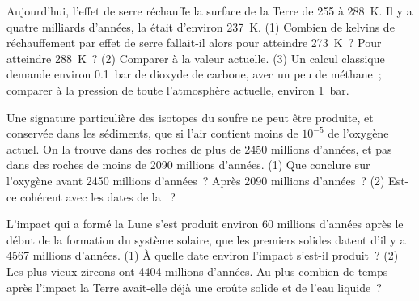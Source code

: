 \begin{exercise}[$\star\star\star$]\label{exo:g12:early-earth:13}
Aujourd'hui, l'effet de serre réchauffe la surface de la Terre de 255 à
\qty{288}{K}. Il y a quatre milliards d'années, la 
était d'environ \qty{237}{K}. (1) Combien de kelvins de réchauffement par
effet de serre fallait-il alors pour atteindre \qty{273}{K}~? Pour
atteindre \qty{288}{K}~? (2) Comparer à la valeur actuelle. (3) Un calcul
classique demande environ \qty{0.1}{bar} de dioxyde de carbone, avec un peu
de méthane~; comparer à la pression de toute l'atmosphère actuelle,
environ \qty{1}{bar}.
\end{exercise}

\begin{exercise}[$\star\star\star$]\label{exo:g12:early-earth:14}
Une signature particulière des isotopes du soufre ne peut être produite, et
conservée dans les sédiments, que si l'air contient moins de $10^{-5}$ de
l'oxygène actuel. On la trouve dans des roches de plus de 2450 millions
d'années, et pas dans des roches de moins de 2090 millions d'années.
(1) Que conclure sur l'oxygène avant 2450 millions d'années~? Après 2090
millions d'années~? (2) Est-ce cohérent avec les dates de la ~?
\end{exercise}

\begin{exercise}[$\star\star\star$]\label{exo:g12:early-earth:15}
L'impact qui a formé la Lune s'est produit environ 60 millions d'années
après le début de la formation du système solaire, que les premiers
solides datent d'il y a 4567 millions d'années. (1) À quelle date environ
l'impact s'est-il produit~? (2) Les plus vieux zircons ont \num{4404}
millions d'années. Au plus combien de temps après l'impact la Terre
avait-elle déjà une croûte solide et de l'eau liquide~?
\end{exercise}

